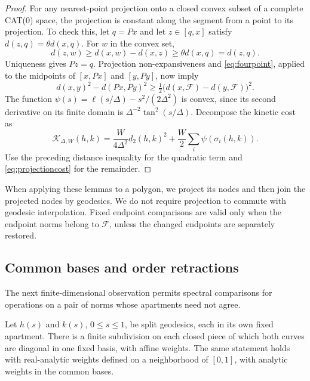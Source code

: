 \begin{proof}
For any nearest-point projection onto a closed convex subset of a
complete CAT(0) space, the projection is constant along the segment
from a point to its projection. To check this, let $q=Px$ and let
$z\in[q,x]$ satisfy $d(z,q)=\theta d(x,q)$. For $w$ in the convex set,
\[
 d(z,w)\ge d(x,w)-d(x,z)\ge\theta d(x,q)=d(z,q).
\]
Uniqueness gives $Pz=q$. Projection non-expansiveness and
\eqref{eq:fourpoint}, applied to the midpoints of $[x,Px]$ and
$[y,Py]$, now imply
\[
 d(x,y)^2-d(Px,Py)^2
   \ge\tfrac12\bigl(d(x,\mathcal F)-d(y,\mathcal F)\bigr)^2.
\]
The function $\psi(s)=\ell(s/\Delta)-s^2/(2\Delta^2)$ is convex,
since its second derivative on its finite domain is
$\Delta^{-2}\tan^2(s/\Delta)$. Decompose the kinetic cost as
\[
 \mathcal K_{\Delta,W}(h,k)
 =\frac{W}{4\Delta^2}d_2(h,k)^2
       +\frac W2\sum_i\psi(\sigma_i(h,k)).
\]
Use the preceding distance inequality for the quadratic term and
\eqref{eq:projectioncost} for the remainder.
\end{proof}

When applying these lemmas to a polygon, we project its nodes and then
join the projected nodes by geodesics. We do not require projection to
commute with geodesic interpolation. Fixed endpoint comparisons are
valid only when the endpoint norms belong to $\mathcal F$, unless the
changed endpoints are separately restored.

\subsection{Common bases and order retractions}
The next finite-dimensional observation permits spectral comparisons for
operations on a pair of norms whose apartments need not agree.

\begin{lemma}\label{lem:finitecommonbases}
Let $h(s)$ and $k(s)$, $0\le s\le1$, be split geodesics, each in its
own fixed apartment. There is a finite subdivision on each closed piece
of which both curves are diagonal in one fixed basis, with affine weights.
The same statement holds with real-analytic weights defined on a
neighborhood of $[0,1]$, with analytic weights in the common bases.
\end{lemma}


